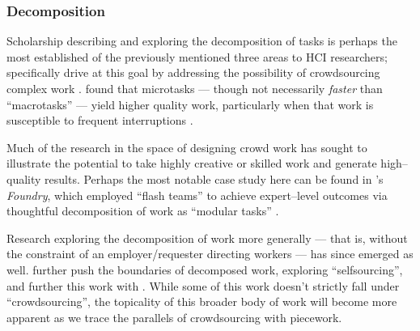 \documentclass[trackingWork]{subfiles}
\begin{document}



\subsubsection{Decomposition}\label{sec:decomposition}
Scholarship describing and exploring
the decomposition of tasks is perhaps the most established
of the previously mentioned three areas
to HCI researchers;
\citeauthor{crowdForgeKittur} specifically
drive at this goal by addressing the possibility of
crowdsourcing complex work
\cite{crowdForgeKittur}.
\citeauthor{cheng2015break} found that microtasks
--- though not necessarily \textit{faster} than ``macrotasks'' ---
yield higher quality work,
particularly when that work is susceptible to frequent interruptions
\cite{cheng2015break}.

Much of the research in the space of designing crowd work has
sought to illustrate the potential to take highly creative or skilled work
and generate high--quality results.
Perhaps the most notable case study here can be found in
\citeauthor{foundry}'s \textit{Foundry}, which employed
``flash teams'' to achieve expert--level outcomes via thoughtful
decomposition of work as ``modular tasks''
\cite{foundry}.

Research exploring the decomposition of work more generally
--- that is, without the constraint of an employer/requester directing workers ---
has since emerged as well.
\citeauthor{selfsourcingTeevan2014} further push the boundaries of decomposed work,
exploring ``selfsourcing'', and further this work with \citeauthor{selfsourcingTeevan2016}
\cite{selfsourcingTeevan2014,selfsourcingTeevan2016}.
While some of this work doesn't strictly fall under ``crowdsourcing'',
the topicality of this broader body of work will become more apparent
as we trace the parallels of crowdsourcing with piecework.
\end{document}
